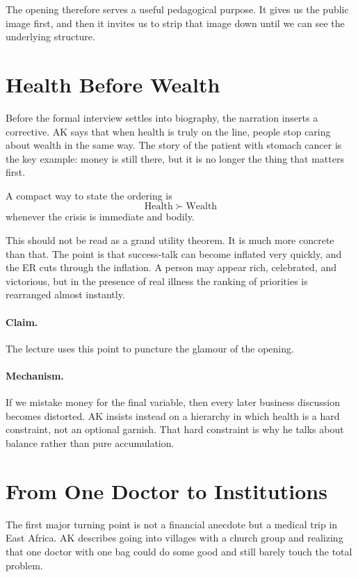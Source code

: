 The opening therefore serves a useful pedagogical purpose. It gives us the public image first, and then it invites us to strip that image down until we can see the underlying structure.

\section{Health Before Wealth}

Before the formal interview settles into biography, the narration inserts a corrective. AK says that when health is truly on the line, people stop caring about wealth in the same way. The story of the patient with stomach cancer is the key example: money is still there, but it is no longer the thing that matters first.

A compact way to state the ordering is
\begin{equation}
\mathrm{Health} \succ \mathrm{Wealth}
\end{equation}
whenever the crisis is immediate and bodily.

This should not be read as a grand utility theorem. It is much more concrete than that. The point is that success-talk can become inflated very quickly, and the ER cuts through the inflation. A person may appear rich, celebrated, and victorious, but in the presence of real illness the ranking of priorities is rearranged almost instantly.

\paragraph{Claim.}
The lecture uses this point to puncture the glamour of the opening.

\paragraph{Mechanism.}
If we mistake money for the final variable, then every later business discussion becomes distorted. AK insists instead on a hierarchy in which health is a hard constraint, not an optional garnish. That hard constraint is why he talks about balance rather than pure accumulation.

\section{From One Doctor to Institutions}

The first major turning point is not a financial anecdote but a medical trip in East Africa. AK describes going into villages with a church group and realizing that one doctor with one bag could do some good and still barely touch the total problem.

